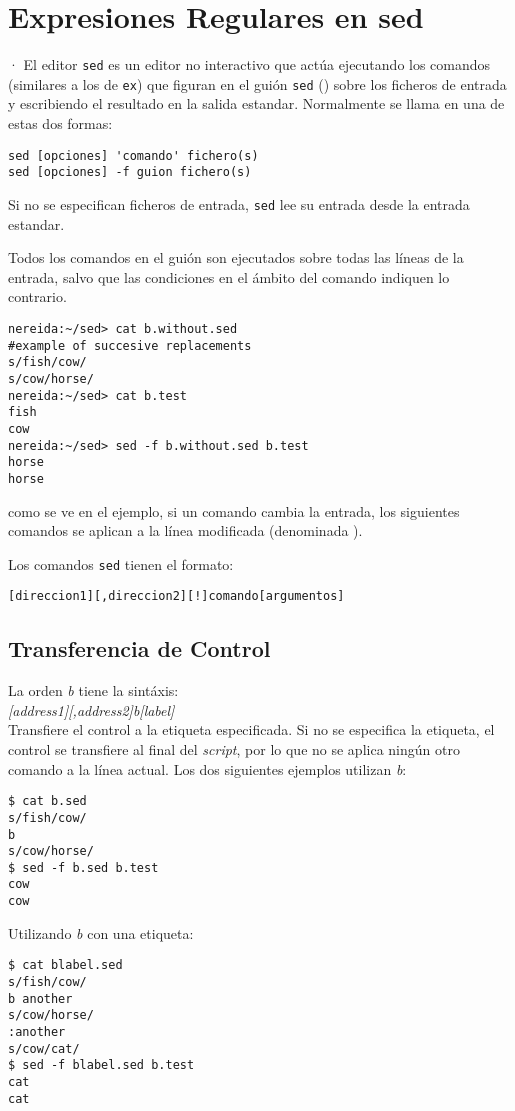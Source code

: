 \chapter{Expresiones Regulares en sed}·
El editor \verb|sed| es un editor no interactivo que actúa
ejecutando los comandos (similares a los de \verb|ex|) que
figuran en el guión \verb|sed| () 
sobre los ficheros de entrada y escribiendo el resultado en la salida estandar.
Normalmente se llama en una de estas dos formas:
\begin{verbatim}
sed [opciones] 'comando' fichero(s)
sed [opciones] -f guion fichero(s)
\end{verbatim}
Si no se especifican ficheros de entrada, \verb|sed| lee su entrada 
desde la entrada estandar.

Todos los comandos en el guión son ejecutados sobre todas las líneas de la
entrada, salvo que las condiciones en el ámbito del comando indiquen lo contrario.

\begin{verbatim}
nereida:~/sed> cat b.without.sed
#example of succesive replacements
s/fish/cow/
s/cow/horse/
nereida:~/sed> cat b.test
fish
cow
nereida:~/sed> sed -f b.without.sed b.test
horse
horse
\end{verbatim}
como se ve en el ejemplo, si un comando cambia la entrada, los siguientes 
comandos se aplican a la línea modificada (denominada ).

Los comandos \verb|sed| tienen el formato:

\begin{verbatim}
[direccion1][,direccion2][!]comando[argumentos]
\end{verbatim}

\section{Transferencia de Control}
La orden \emph{b} tiene la sintáxis:\\
{\it [address1][,address2]b[label]}\\
Transfiere el control a la etiqueta especificada. Si no se especifica
la etiqueta, el control se transfiere al final del {\it script}, por lo que
no se aplica ningún otro comando a la línea actual. Los dos siguientes
ejemplos utilizan {\it b}:
\begin{verbatim}
$ cat b.sed
s/fish/cow/
b
s/cow/horse/
$ sed -f b.sed b.test
cow
cow
\end{verbatim}
Utilizando {\it b} con una etiqueta:
\begin{verbatim}
$ cat blabel.sed
s/fish/cow/
b another
s/cow/horse/
:another
s/cow/cat/
$ sed -f blabel.sed b.test
cat
cat
\end{verbatim}

